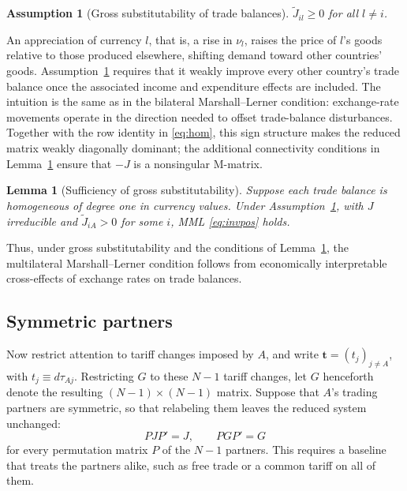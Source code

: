 \documentclass[11pt]{article}
\newtheorem{lemma}[theorem]{Lemma}
\newtheorem{assumption}{Assumption}[section]
\begin{document}
\begin{assumption}[Gross substitutability of trade balances]\label{asm:gross-subst}
$\widetilde J_{il}\geq0$ for all $l\neq i$.
\end{assumption}

An appreciation of currency $l$, that is, a rise in $\nu_l$, raises the price of $l$'s goods relative to those produced elsewhere, shifting demand toward other countries' goods. Assumption~\ref{asm:gross-subst} requires that it weakly improve every other country's trade balance once the associated income and expenditure effects are included. The intuition is the same as in the bilateral Marshall--Lerner condition: exchange-rate movements operate in the direction needed to offset trade-balance disturbances. Together with the row identity in \eqref{eq:hom}, this sign structure makes the reduced matrix weakly diagonally dominant; the additional connectivity conditions in Lemma~\ref{lem:gs-sufficiency} ensure that $-J$ is a nonsingular M-matrix.

\begin{lemma}[Sufficiency of gross substitutability]
Suppose each trade balance is homogeneous of degree one in currency values. Under Assumption~\ref{asm:gross-subst}, with $J$ irreducible and $\widetilde J_{iA}>0$ for some $i$, MML \eqref{eq:invpos} holds.
\label{lem:gs-sufficiency}
\end{lemma}

\noindent Thus, under gross substitutability and the conditions of Lemma~\ref{lem:gs-sufficiency}, the multilateral Marshall--Lerner condition follows from economically interpretable cross-effects of exchange rates on trade balances.

\subsection{Symmetric partners}
\label{sec:exch}

Now restrict attention to tariff changes imposed by $A$, and write $\mathbf{t}=(t_j)_{j\neq A}$, with $t_j\equiv d\tau_{Aj}$. Restricting $G$ to these $N-1$ tariff changes, let $G$ henceforth denote the resulting $(N-1)\times(N-1)$ matrix. Suppose that $A$'s trading partners are symmetric, so that relabeling them leaves the reduced system unchanged:
\[
PJP'=J, \qquad PGP'=G
\]
for every permutation matrix $P$ of the $N-1$ partners. This requires a baseline that treats the partners alike, such as free trade or a common tariff on all of them.
\end{document}
